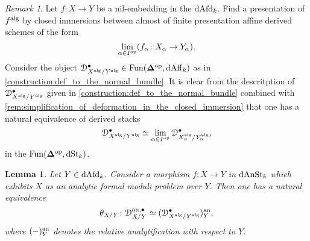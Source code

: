\documentclass[10pt,a4paper,reqno]{amsart} %
\theoremstyle{plain}
\newtheorem{lem}[thm]{Lemma}
\theoremstyle{definition}
\theoremstyle{remark}
\newtheorem{rem}[thm]{Remark}
\numberwithin{equation}{section}
\begin{document}
\begin{rem} Let $f \colon X \to Y$ be a nil-embedding in the \infcat $\mathrm{dAfd}_k$. Find a presentation of $f^\mathrm{alg}$ by closed immersions between almost of finite presentation affine derived schemes of the form
        \[
            \lim_{\alpha \in I^\mathrm{op}}(f_\alpha \colon X_\alpha \to Y_\alpha).  
        \]
    Consider the object $\mathcal D_{X^\mathrm{alg}/ Y^\mathrm{alg}}^\bullet \in \operatorname{Fun}(\bm{\Delta} ^\mathrm{op}, \mathrm{dAff}_k)$ as in \cref{construction:def_to_the_normal_bundle}.
    It is clear from the descritption
    of $\mathcal D_{X^\mathrm{alg}/Y^\mathrm{alg}}^\bullet$ given in \cref{construction:def_to_the_normal_bundle} combined with \cref{rem:simplification_of_deformation_in_the_closed_immersion}
    that one has a natural equivalence of derived stacks
        \[
            \mathcal D_{X^\mathrm{alg}/Y^\mathrm{alg}}^\bullet \simeq \lim_{\alpha \in I^\mathrm{op}} \mathcal D_{X_\alpha^\mathrm{alg}/ Y_\alpha^\mathrm{alg}}^\bullet,
        \]
    in the \infcat $\mathrm{Fun}(\bm{\Delta} ^\mathrm{op}, \mathrm{dSt}_k)$.
\end{rem}


\begin{lem} \label{lem:analytification_of_simplicial_object_deformation}
    Let $Y \in \mathrm{dAfd}_k$. Consider a morphism $f \colon X \to Y$ in $\mathrm{dAnSt}_k$ which exhibits $X$ as an analytic formal moduli problem
    over $Y$. Then one has a natural equivalence
        \[
            \theta_{X/ Y} \colon \mathcal D_{X/Y}^{\mathrm{an}, \bullet} \simeq (\mathcal D_{X^\mathrm{alg}/ Y^\mathrm{alg}}^\bullet)^\mathrm{an}_Y  ,
        \]
    where $(-)_Y^\mathrm{an}$ denotes the relative analytification with respect to $Y$.
\end{lem}
\end{document}
